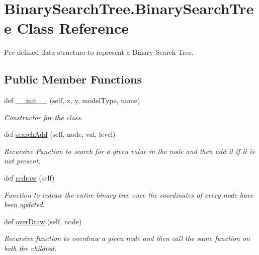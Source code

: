\hypertarget{class_binary_search_tree_1_1_binary_search_tree}{}\section{Binary\+Search\+Tree.\+Binary\+Search\+Tree Class Reference}
\label{class_binary_search_tree_1_1_binary_search_tree}


Pre-\/defined data structure to represent a Binary Search Tree.  


\subsection*{Public Member Functions}
\begin{DoxyCompactItemize}
\item 
def \hyperlink{class_binary_search_tree_1_1_binary_search_tree_a427e86bf2d372a1b518489843bc85103}{\+\_\+\+\_\+init\+\_\+\+\_\+} (self, x, y, model\+Type, name)
\begin{DoxyCompactList}\small\item\em Constructor for the class. \end{DoxyCompactList}\item 
def \hyperlink{class_binary_search_tree_1_1_binary_search_tree_a5168edcb8e13e75c4d9f9d016cf922e0}{search\+Add} (self, node, val, level)
\begin{DoxyCompactList}\small\item\em Recursive Function to search for a given value in the node and then add it if it is not present. \end{DoxyCompactList}\item 
\mbox{\label{class_binary_search_tree_1_1_binary_search_tree_a590449bc083a03f8746362ae21081c6b}} 
def \hyperlink{class_binary_search_tree_1_1_binary_search_tree_a590449bc083a03f8746362ae21081c6b}{redraw} (self)
\begin{DoxyCompactList}\small\item\em Function to redraw the entire binary tree once the coordinates of every node have been updated. \end{DoxyCompactList}\item 
def \hyperlink{class_binary_search_tree_1_1_binary_search_tree_a78d7a635850da8941d434365d6447f75}{over\+Draw} (self, node)
\begin{DoxyCompactList}\small\item\em Recursive function to overdraw a given node and then call the same function on both the childred. \end{DoxyCompactList}\item 

\end{DoxyCompactItemize}
